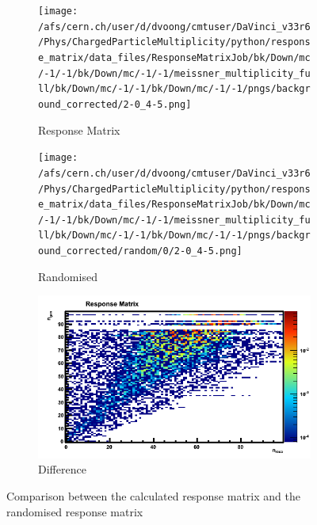 \begin{figure}[h]
	\centering
	\begin{subfigure}{0.32\textwidth}
		\texttt{[image: /afs/cern.ch/user/d/dvoong/cmtuser/DaVinci\_v33r6/Phys/ChargedParticleMultiplicity/python/response\_matrix/data\_files/ResponseMatrixJob/bk/Down/mc/-1/-1/bk/Down/mc/-1/-1/meissner\_multiplicity\_full/bk/Down/mc/-1/-1/bk/Down/mc/-1/-1/pngs/background\_corrected/2-0\_4-5.png]}
		\caption{Response Matrix}
	\end{subfigure}
	\begin{subfigure}{0.32\textwidth}
		\texttt{[image: /afs/cern.ch/user/d/dvoong/cmtuser/DaVinci\_v33r6/Phys/ChargedParticleMultiplicity/python/response\_matrix/data\_files/ResponseMatrixJob/bk/Down/mc/-1/-1/bk/Down/mc/-1/-1/meissner\_multiplicity\_full/bk/Down/mc/-1/-1/bk/Down/mc/-1/-1/pngs/background\_corrected/random/0/2-0\_4-5.png]}
		\caption{Randomised}
	\end{subfigure}
	\begin{subfigure}{0.32\textwidth}
		\includegraphics[width=\textwidth]{Chapters/multiplicity/charged_particle_event_multiplicity/images/systematics/response_matrix_diff.png}
		\caption{Difference}
	\end{subfigure}
	\caption{Comparison between the calculated response matrix and the randomised response matrix}
	\label{fig: comparison between calculated response matrix and randomised response matrix}
\end{figure}

